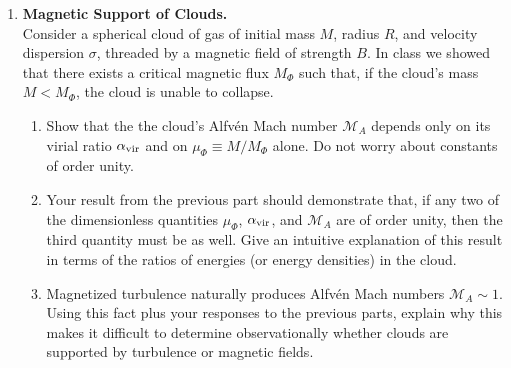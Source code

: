 \begin{enumerate}
\item \textbf{Magnetic Support of Clouds.}\\
Consider a spherical cloud of gas of initial mass $M$, radius $R$, and velocity dispersion $\sigma$, threaded by a magnetic field of strength $B$. In class we showed that there exists a critical magnetic flux $M_\Phi$ such that, if the cloud's mass $M<M_\Phi$, the cloud is unable to collapse.
\begin{enumerate}
\item Show that the the cloud's Alfv\'en Mach number $\mathcal{M}_A$ depends only on its virial ratio $\alpha_{\rm vir}$ and on $\mu_\Phi \equiv M/M_\Phi$ alone. Do not worry about constants of order unity. 
\item Your result from the previous part should demonstrate that, if any two of the dimensionless quantities $\mu_\Phi$, $\alpha_{\rm vir}$, and $\mathcal{M}_A$ are of order unity, then the third quantity must be as well. Give an intuitive explanation of this result in terms of the ratios of energies (or energy densities) in the cloud.
\item Magnetized turbulence naturally produces Alfv\'en Mach numbers $\mathcal{M}_A \sim 1$. Using this fact plus your responses to the previous parts, explain why this makes it difficult to determine observationally whether clouds are supported by turbulence or magnetic fields.
\end{enumerate}


\end{enumerate}
